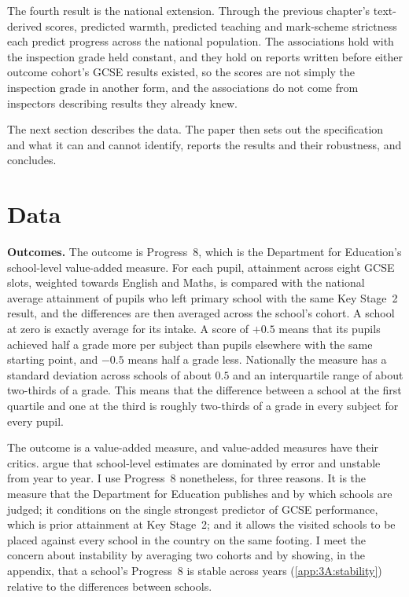 The fourth result is the national extension. Through the previous chapter's text-derived scores, predicted warmth, predicted teaching and mark-scheme strictness each predict progress across the national population. The associations hold with the inspection grade held constant, and they hold on reports written before either outcome cohort's GCSE results existed, so the scores are not simply the inspection grade in another form, and the associations do not come from inspectors describing results they already knew.

The next section describes the data. The paper then sets out the
specification and what it can and cannot identify, reports the results and
their robustness, and concludes.

\section{Data}
\label{sec:p2_data}

\textbf{Outcomes.} The outcome is Progress~8, which is the Department for
Education's school-level value-added measure. For each pupil, attainment
across eight GCSE slots, weighted towards English and Maths, is compared with
the national average attainment of pupils who left primary school with the
same Key Stage~2 result, and the differences are then averaged across the
school's cohort. A school at zero is exactly average for its intake. A score
of $+0.5$ means that its pupils achieved half a grade more per subject than
pupils elsewhere with the same starting point, and $-0.5$ means half a grade
less. Nationally the measure has a standard deviation across schools of
about $0.5$ and an interquartile range of about two-thirds of a grade. This
means that the difference between a school at the first quartile and one at
the third is roughly two-thirds of a grade in every subject for every pupil.

The outcome is a value-added measure, and value-added measures have their
critics. \citet{gorard2010,gorard2013} argue that school-level estimates are
dominated by error and unstable from year to year. I use Progress~8
nonetheless, for three reasons. It is the measure that the Department for
Education publishes and by which schools are judged; it conditions on the
single strongest predictor of GCSE performance, which is prior attainment at
Key Stage~2; and it allows the visited schools to be placed against every
school in the country on the same footing. I meet the concern about
instability by averaging two cohorts and by showing, in the appendix, that
a school's Progress~8 is stable across years (\cref{app:3A:stability})
relative to the differences between schools.

